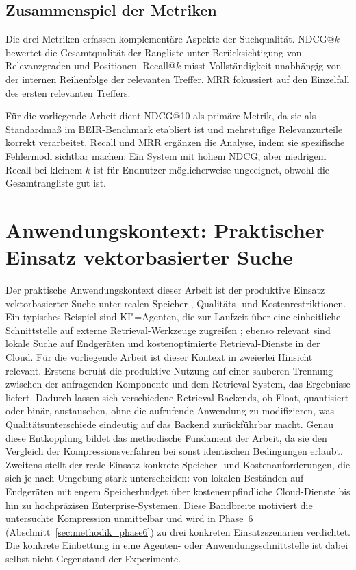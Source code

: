\subsection{Zusammenspiel der Metriken}
%
Die drei Metriken erfassen komplementäre Aspekte der Suchqualität.
NDCG@$k$ bewertet die Gesamtqualität der Rangliste unter Berücksichtigung von Relevanzgraden und Positionen.
Recall@$k$ misst Vollständigkeit unabhängig von der internen Reihenfolge der relevanten Treffer.
MRR fokussiert auf den Einzelfall des ersten relevanten Treffers.
\par
Für die vorliegende Arbeit dient NDCG@10 als primäre Metrik, da sie als Standardmaß im BEIR-Benchmark \cite{thakur_2021_beir} etabliert ist und mehrstufige Relevanzurteile korrekt verarbeitet.
Recall und MRR ergänzen die Analyse, indem sie spezifische Fehlermodi sichtbar machen: Ein System mit hohem NDCG, aber niedrigem Recall bei kleinem $k$ ist für Endnutzer möglicherweise ungeeignet, obwohl die Gesamtrangliste gut ist.
%
%
\section{Anwendungskontext: Praktischer Einsatz vektorbasierter Suche}
\label{sec:grundlagen_anwendungskontext}
%
Der praktische Anwendungskontext dieser Arbeit ist der produktive Einsatz vektorbasierter Suche unter realen Speicher-, Qualitäts- und Kostenrestriktionen.
Ein typisches Beispiel sind KI"=Agenten, die zur Laufzeit über eine einheitliche Schnittstelle auf externe Retrieval-Werkzeuge zugreifen \cite{schick_2023_toolformer,yao_2023_react,lewis_2020_rag}; ebenso relevant sind lokale Suche auf Endgeräten und kostenoptimierte Retrieval-Dienste in der Cloud.
%
Für die vorliegende Arbeit ist dieser Kontext in zweierlei Hinsicht relevant.
Erstens beruht die produktive Nutzung auf einer sauberen Trennung zwischen der anfragenden Komponente und dem Retrieval-System, das Ergebnisse liefert.
Dadurch lassen sich verschiedene Retrieval-Backends, ob Float, quantisiert oder binär, austauschen, ohne die aufrufende Anwendung zu modifizieren, was Qualitätsunterschiede eindeutig auf das Backend zurückführbar macht.
Genau diese Entkopplung bildet das methodische Fundament der Arbeit, da sie den Vergleich der Kompressionsverfahren bei sonst identischen Bedingungen erlaubt.
Zweitens stellt der reale Einsatz konkrete Speicher- und Kostenanforderungen, die sich je nach Umgebung stark unterscheiden: von lokalen Beständen auf Endgeräten mit engem Speicherbudget über kostenempfindliche Cloud-Dienste bis hin zu hochpräzisen Enterprise-Systemen.
Diese Bandbreite motiviert die untersuchte Kompression unmittelbar und wird in Phase~6 (Abschnitt~\ref{sec:methodik_phase6}) zu drei konkreten Einsatzszenarien verdichtet.
Die konkrete Einbettung in eine Agenten- oder Anwendungsschnittstelle ist dabei selbst nicht Gegenstand der Experimente.
